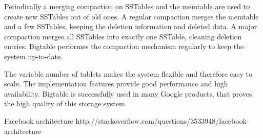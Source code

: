 Periodically a merging compaction on SSTables and the memtable are used to create new SSTables out of old ones.
A regular compaction merges the memtable and a few SSTables, keeping the deletion information and deleted data.
A major compaction merges all SSTables into exactly one SSTable, cleaning deletion entries.
Bigtable performes the compaction mechanism regularly to keep the system up-to-date.

The variable number of tablets makes the system flexible and therefore easy to scale.
The implementation features provide good performance and high availability.
Bigtable is successfully used in many Google products, that proves the high quality of this storage system.


Facebook architecture
http://stackoverflow.com/questions/3533948/facebook-architecture